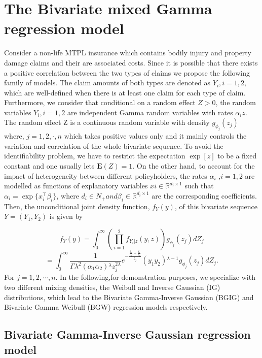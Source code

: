 \documentclass[12pt]{article}%
\theoremstyle{definition}
\theoremstyle{remark}
\begin{document}
	\section{ The Bivariate mixed Gamma regression model}
	Consider a non-life MTPL insurance which contains bodily injury and property damage claims and their are associated costs. Since it is possible that there exists a positive 
	correlation between the two types of claims we propose the following family of models. 
	The claim amounts of both types are denoted as $Y_i
	, i = 1, 2,$ which are well-defined when there is at least one claim for each type of claim. Furthermore, we consider that conditional on a random effect $Z > 0$, the random variables $Y_i 	, i = 1, 2$ are independent 
	Gamma random variables with rates $ \alpha_{i}z$. The random effect Z is a continuous random 
	variable with density $g_{\phi_{j}}(z_j)$ where, $j=1,2,\cdot,n$ which takes positive values only and it mainly controls the 
	variation and correlation of the whole bivariate sequence. To avoid the identifiability 
	problem, we have to restrict the expectation $\exp [z] $  to be a fixed constant and one usually 	lets $\mathbf{E}(Z) = 1$. On the other hand, to account for the impact of heterogeneity between 	different policyholders, the rates $\alpha_i$
	,$ i = 1, 2$ are modelled as functions of explanatory 
	variables $ xi \in \mathbb{R}^{d_i\times1}$
	such that $\alpha_i = \exp\{x_i^\top
		\beta_i
	\}$, where $d_i \in N_+ and \beta_i \in \mathbb{R}^{d_i\times1}$ are the 
	corresponding coefficients. Then, the unconditional joint density function, $f_Y(y)$, of this 
	bivariate sequence $Y = (Y_1,Y_2)$ is given by
	
	\begin{equation}
		f_Y(y)= \int _0^{\infty }(\prod _{i=1}^2 f_{Y_{i}|z}(y,z))g_{\phi_{j}}(z_j) dZ_j
	\end{equation}
	\begin{equation*}
	=\int _0^{\infty }\frac{1}{\Gamma \lambda ^2 \left(\alpha _1 \alpha _2\right){}^{\lambda } z_j^{2 \lambda }}e^{-\frac{\frac{y_1}{\alpha _1}+\frac{y_2}{\alpha _2}}{z_j}}\left(y_1 y_2\right){}^{\lambda -1}g_{\phi_{j}}(z_j) dZ_j.
	\end{equation*}
For $j=1,2,\cdots,n$. In the following,for demonstration purposes, we specialize with two different mixing 
densities, the Weibull and Inverse Gaussian (IG) distributions, which lead to 
the Bivariate Gamma-Inverse Gaussian (BGIG) and Bivariate Gamma Weibull (BGW)  regression 
models respectively.

\subsection{Bivariate Gamma-Inverse Gaussian regression model}
\end{document}
